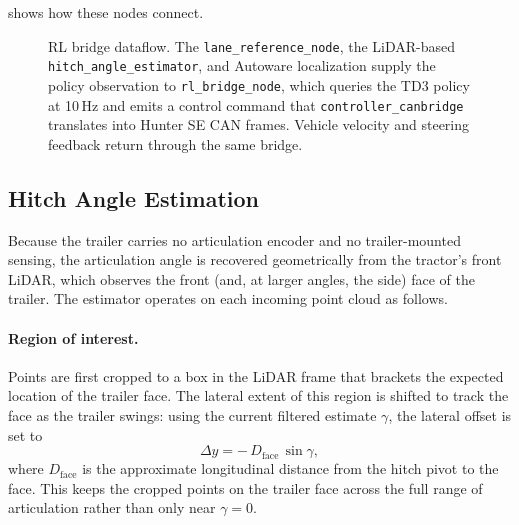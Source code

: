  shows how these nodes connect.

\begin{figure}[t]
  \centering
  \resizebox{\textwidth}{!}{}
  \caption{RL bridge dataflow. The \texttt{lane\_reference\_node}, the LiDAR-based \texttt{hitch\_angle\_estimator}, and Autoware localization supply the policy observation to \texttt{rl\_bridge\_node}, which queries the TD3 policy at 10\,Hz and emits a control command that \texttt{controller\_canbridge} translates into Hunter SE CAN frames. Vehicle velocity and steering feedback return through the same bridge.}
  \label{fig:rl_bridge}
\end{figure}

\subsection{Hitch Angle Estimation}
\label{sec:hitch_estimation}

Because the trailer carries no articulation encoder and no trailer-mounted sensing, the articulation angle is recovered geometrically from the tractor's front LiDAR, which observes the front (and, at larger angles, the side) face of the trailer. The estimator operates on each incoming point cloud as follows.

\paragraph{Region of interest.} Points are first cropped to a box in the LiDAR frame that brackets the expected location of the trailer face. The lateral extent of this region is shifted to track the face as the trailer swings: using the current filtered estimate $\gamma$, the lateral offset is set to
\begin{equation}
    \Delta y = -\,D_\text{face}\,\sin\gamma,
    \label{eq:hitch_roi_shift}
\end{equation}
where $D_\text{face}$ is the approximate longitudinal distance from the hitch pivot to the face. This keeps the cropped points on the trailer face across the full range of articulation rather than only near $\gamma = 0$.

